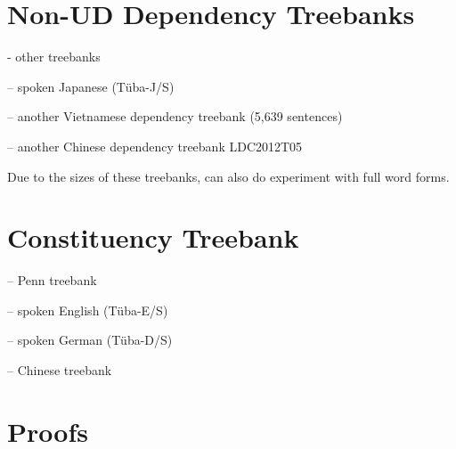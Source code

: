 \documentclass[11pt,letterpaper]{article}
\begin{document}
\section{Non-UD Dependency Treebanks}



- other treebanks



-- spoken Japanese (T{\"u}ba-J/S)

-- another Vietnamese dependency treebank \citep{nguyen-bktreebank:-2017} (5,639 sentences)


-- another Chinese dependency treebank LDC2012T05


Due to the sizes of these treebanks, can also do experiment with full word forms.


\section{Constituency Treebank}

-- Penn treebank \citep{marcus-building-1993}

-- spoken English (T{\"u}ba-E/S)

-- spoken German (T{\"u}ba-D/S)

-- Chinese treebank \citep{xue-chinese-2013}


\section{Proofs}
\end{document}
